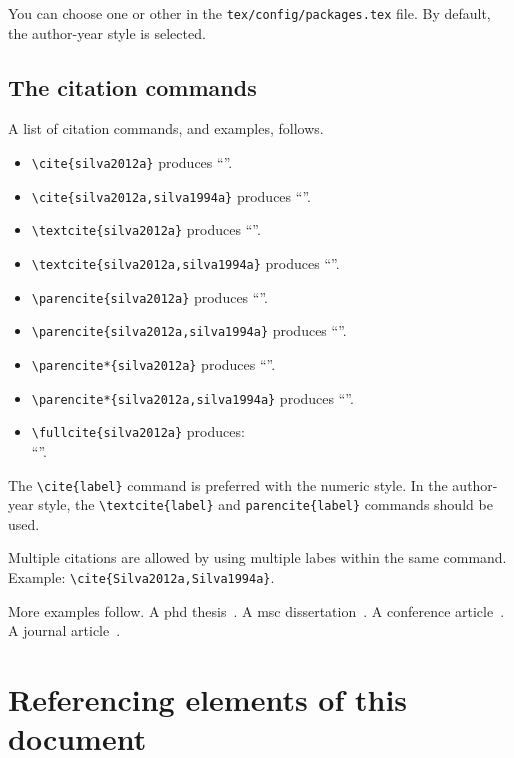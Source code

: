 You can choose one or other in the \verb+tex/config/packages.tex+ file. By default, the author-year style is selected.

\subsection{The citation commands}
\label{ssec:the-citation-commands}

A list of citation commands, and examples, follows.

\begin{itemize}
\item
\verb+\cite{silva2012a}+ produces ``\cite{silva2012a}''.
\item
\verb+\cite{silva2012a,silva1994a}+ produces ``\cite{silva2012a,silva1994a}''.
\item
\verb+\textcite{silva2012a}+ produces ``\textcite{silva2012a}''.
\item
\verb+\textcite{silva2012a,silva1994a}+ produces ``\textcite{silva2012a,silva1994a}''.
\item
\verb+\parencite{silva2012a}+ produces ``\parencite{silva2012a}''.
\item
\verb+\parencite{silva2012a,silva1994a}+ produces ``\parencite{silva2012a,silva1994a}''.
\item
\verb+\parencite*{silva2012a}+ produces ``\parencite*{silva2012a}''.
\item
\verb+\parencite*{silva2012a,silva1994a}+ produces ``\parencite*{silva2012a,silva1994a}''.
\item
\verb+\fullcite{silva2012a}+ produces:\\``''.
\end{itemize}

The \verb+\cite{label}+ command is preferred with the numeric style. In the author-year style, the \verb+\textcite{label}+ and \verb+parencite{label}+ commands should be used.

Multiple citations are allowed by using multiple labes within the same command. Example: \verb+\cite{Silva2012a,Silva1994a}+.

More examples follow. A \acrshort{phd} thesis~\parencite{silva1994a}. A \acrshort{msc} dissertation~\parencite{antunes2015a}. A conference article~\parencite{antunes2020a}. A journal article~\parencite{antunes2019a}.

\section{Referencing elements of this document}
\label{sec:referencing-elements-of-this-document}

